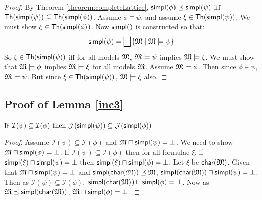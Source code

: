 \begin{proof}
By Theorem \ref{theorem:completeLattice}, $ \mathsf{simpl}(\phi) \preceq \mathsf{simpl}(\psi)$ iff $\mathsf{Th}(\mathsf{simpl}(\psi)) \subseteq  \mathsf{Th}(\mathsf{simpl}(\phi))$.
Assume $\phi \models \psi$, and assume $\xi \in \mathsf{Th}(\mathsf{simpl}(\psi)) $. We must show $\xi \in \mathsf{Th}(\mathsf{simpl}(\phi)) $.
Now $\SIMPL$ is constructed so that:
\[
\mathsf{simpl}(\psi) = \bigsqcup \{ \frak{M} \; | \; \frak{M} \models \psi \}
\]
So  $\xi \in \mathsf{Th}(\mathsf{simpl}(\psi)) $ iff for all models $\frak{M}$, $\frak{M} \models \psi$ implies $\frak{M} \models \xi$.
We must show that $\frak{M} \models \phi$ implies $\frak{M} \models \xi$ for all models $\frak{M}$.
Assume $\frak{M} \models \phi$. Then since $\phi \models \psi$,  $\frak{M} \models \psi$. 
But since $\xi \in \mathsf{Th}(\mathsf{simpl}(\psi)) $, $\frak{M} \models \xi$ also.

\end{proof}

\subsection{Proof of Lemma \ref{inc3}}
If $\mathcal{I}(\psi) \subseteq \mathcal{I}(\phi) \mbox{ then } \mathcal{J}(\mathsf{simpl}(\psi)) \subseteq \mathcal{J}(\mathsf{simpl}(\phi))$
\begin{proof}
Assume $\mathcal{I}(\psi) \subseteq \mathcal{I}(\phi)$ and $\frak{M} \sqcap \mathsf{simpl}(\psi) = \bot$.
We need to show $\frak{M} \sqcap \mathsf{simpl}(\phi) = \bot$.
If $\mathcal{I}(\psi) \subseteq \mathcal{I}(\phi)$ then for all formulae $\xi$, if $\mathsf{simpl}(\xi) \sqcap \mathsf{simpl}(\psi) = \bot$ then $\mathsf{simpl}(\xi) \sqcap \mathsf{simpl}(\phi) = \bot$.
Let $\xi$ be $\mathsf{char}(\frak{M})$.
Given that $\frak{M} \sqcap \mathsf{simpl}(\psi) = \bot$ and $\mathsf{simpl}(\mathsf{char}(\frak{M})) \preceq \frak{M}$, $\mathsf{simpl}(\mathsf{char}(\frak{M})) \sqcap \mathsf{simpl}(\psi) = \bot$.
Then as $\mathcal{I}(\psi) \subseteq \mathcal{I}(\phi)$, $\mathsf{simpl}(\mathsf{char}(\frak{M})) \sqcap \mathsf{simpl}(\phi) = \bot$.
Now as $\frak{M}  \preceq \mathsf{simpl}(\mathsf{char}(\frak{M}))$, $\frak{M} \sqcap \mathsf{simpl}(\phi) = \bot$.

\end{proof}

